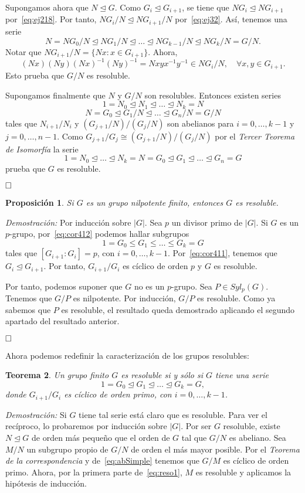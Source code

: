 \documentclass[12pt]{article}
\newtheorem{theorem}{Teorema}[section]
\newtheorem{proposition}[theorem]{Proposición}
\begin{document}
Supongamos ahora que $N \unlhd G$. Como $G_i \unlhd G_{i+1}$, se tiene que $NG_i \unlhd NG_{i+1}$ por~\ref{eq:ej218}. Por tanto, $NG_i/N \unlhd NG_{i+1}/N$ por~\ref{eq:ej32}. Así, tenemos una serie $$N = NG_0/N \unlhd NG_1/N \unlhd \ldots \unlhd NG_{k-1}/N \unlhd NG_k/N = G/N.$$ Notar que $NG_{i+1}/N = \lbrace Nx : x \in G_{i+1} \rbrace$. Ahora, $$(Nx)(Ny)(Nx)^{-1}(Ny)^{-1} = Nxyx^{-1}y^{-1} \in NG_i/N, \quad \forall x,y \in G_{i+1}.$$ Esto prueba que $G/N$ es resoluble. 

Supongamos finalmente que $N$ y $G/N$ son resolubles. Entonces existen series $$1 = N_0 \unlhd N_1 \unlhd \ldots \unlhd N_k = N$$ $$N = G_0 \unlhd G_1/N \unlhd \ldots \unlhd G_n/N = G/N$$ tales que $N_{i+1}/N_i$ y $(G_{j+1}/N)/(G_j/N)$ son abelianos para $i = 0, \ldots, k-1$ y $j = 0, \ldots, n-1$. Como $G_{j+1}/G_j \cong (G_{j+1}/N)/(G_j/N)$ por el \textit{Tercer Teorema de Isomorfía} la serie $$1 = N_0 \unlhd \ldots \unlhd N_k = N = G_0 \unlhd G_1 \unlhd \ldots \unlhd G_n = G$$ prueba que $G$ es resoluble.

$\hfill \square$

\begin{proposition}Si $G$ es un grupo nilpotente finito, entonces $G$ es resoluble.
\end{proposition}
\emph{Demostración: }Por inducción sobre $|G|$. Sea $p$ un divisor primo de $|G|$. Si $G$ es un $p$-grupo, por~\ref{eq:cor412} podemos hallar subgrupos $$1 = G_0 \leq G_1 \leq\ldots \leq G_k = G$$ tales que $[G_{i+1}:G_i] = p$, con $i=0, \ldots, k-1$. Por~\ref{eq:cor411}, tenemos que $G_i \unlhd G_{i+1}$. Por tanto, $G_{i+1}/G_i$ es cíclico de orden $p$ y $G$ es resoluble. 

Por tanto, podemos suponer que $G$ no es un $p$-grupo. Sea $P \in Syl_p(G)$. Tenemos que $G/P$ es nilpotente. Por inducción, $G/P$ es resoluble. Como ya sabemos que $P$ es resoluble, el resultado queda demostrado aplicando el segundo apartado del resultado anterior. 

$\hfill \square$

Ahora podemos redefinir la caracterización de los grupos resolubles: 

\begin{theorem}
Un grupo finito $G$ es resoluble si y sólo si $G$ tiene una serie $$1 = G_0 \unlhd G_1 \unlhd \ldots \unlhd G_k =G,$$ donde $G_{i+1}/G_i$ es cíclico de orden primo, con $i= 0, \ldots, k-1$.
\end{theorem}
\emph{Demostración: }Si $G$ tiene tal serie está claro que es resoluble. Para ver el recíproco, lo probaremos por inducción sobre $|G|$. Por ser $G$ resoluble, existe $N \unlhd G$ de orden más pequeño que el orden de $G$ tal que $G/N$ es abeliano. Sea $M/N$ un subgrupo propio de $G/N$ de orden el más mayor posible. Por el \textit{Teorema de la correspondencia} y de~\ref{eq:abSimple} tenemos que $G/M$ es cíclico de orden primo. Ahora, por la primera parte de~\ref{eq:reso1}, $M$ es resoluble y aplicamos la hipótesis de inducción.
\end{document}
